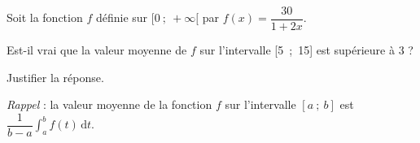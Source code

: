 \medskip

Soit la fonction $f$ définie sur $[0~;~+ \infty[$ par 
$f(x) = \dfrac{30}{1 + 2x}$.

Est-il vrai que la valeur moyenne de $f$ sur l'intervalle [5~;~15] est supérieure à 3 ?

Justifier la réponse.

\textit{Rappel} : la valeur moyenne de la fonction $f$ sur l'intervalle $[a~;~b]$ est $\displaystyle\dfrac{1}{b - a}\int_a^b f(t)\,\text{d}t$.

\bigskip
